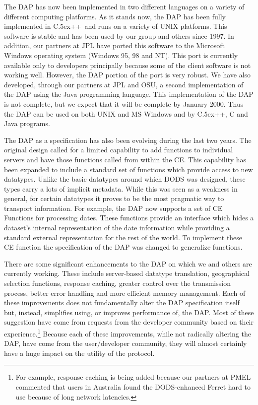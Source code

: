 \documentclass[10pt]{article}
\newcommand{\Cpp}{{\rm {\small C}\raise.5ex\hbox{\footnotesize ++}}}
\begin{document}
The DAP has now been implemented in two different languages on a variety of
different computing platforms. As it stands now, the DAP has been fully
implemented in \Cpp\ and runs on a variety of UNIX platforms. This software
is stable and has been used by our group and others since 1997. In addition,
our partners at JPL have ported this software to the Microsoft Windows
operating system (Windows 95, 98 and NT). This port is currently available
only to developers principally because some of the client software is not
working well. However, the DAP portion of the port is very robust. We have
also developed, through our partners at JPL and OSU, a second implementation
of the DAP using the Java programming language. This implementation of the
DAP is not complete, but we expect that it will be complete by January 2000.
Thus the DAP can be used on both UNIX and MS Windows and by \Cpp, C and
Java programs.

The DAP as a specification has also been evolving during the last two years.
The original design called for a limited capability to add functions to
individual servers and have those functions called from within the CE. This
capability has been expanded to include a standard set of functions which
provide access to new datatypes. Unlike the basic datatypes around which DODS
was designed, these types carry a lots of implicit metadata. While this was
seen as a weakness in general, for certain datatypes it proves to be the most
pragmatic way to transport information. For example, the DAP now supports a
set of CE Functions for processing dates. These functions provide an
interface which hides a dataset's internal representation of the date
information while providing a standard external representation for the rest
of the world. To implement these CE function the specification of the DAP was
changed to generalize functions.

There are some significant enhancements to the DAP on which we and others are
currently working. These include server-based datatype translation,
geographical selection functions, response caching, greater control over the
transmission process, better error handling and more efficient memory
management. Each of these improvements does not fundamentally alter the DAP
specification itself but, instead, simplifies using, or improves performance
of, the DAP. Most of these suggestion have come from requests from the
developer community based on their experience.\footnote{For example, response
caching is being added because our partners at PMEL commented that users in
Australia found the DODS-enhanced Ferret hard to use because of long network
latencies.} Because each of these improvements, while not radically altering
the DAP, have come from the user/developer community, they will almost
certainly have a huge impact on the utility of the protocol.
\end{document}
